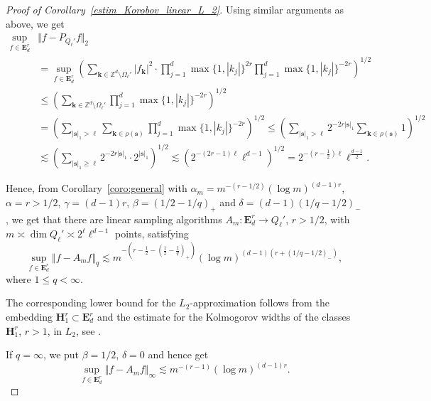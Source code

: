 \documentclass[a4paper,12pt]{amsart}
\theoremstyle{definition}
\theoremstyle{remark}
\newcommand{\abs}[1]{\left|#1\right|}
\newcommand{\bk}{\mathbf{k}}
\begin{document}
{\begin{proof}[Proof of Corollary~\ref{estim_Korobov_linear_L_2}]
Using similar arguments as above, we get
\begin{align*}
	\sup_{f \in \mathbf{E}^r_d} & \Vert f - P_{Q_\ell'} f  \Vert_2
	\\ 
&	=
		\sup_{f \in \mathbf{E}^r_d} \left(
		\sum_{\bk\in \mathbb{Z}^d \setminus \Omega_\ell'}
		\abs{f_{\bk}}^2 \cdot \prod_{j=1}^{d}\max \{1,  \abs{k_j}\}^{2r} 
		\prod_{j=1}^{d}\max \{1,  \abs{k_j}\}^{-2r} 
		\right)^{1/2}
		\\
& 
\leq 
	\left( \sum_{\bk\in \mathbb{Z}^d \setminus \Omega_\ell'}
	\prod_{j=1}^{d}\max \{1,  \abs{k_j}\}^{-2r}
	\right)^{1/2}
\\
& =\left( \sum_{\abs{\boldsymbol{s}}_1 > \ell}  \sum_{\bk\in \rho(\boldsymbol{s})} 
	\prod_{j=1}^{d}\max \{1,  \abs{k_j}\}^{-2r}
	\right)^{1/2}
	\leq \left( \sum_{\abs{\boldsymbol{s}}_1 > \ell}  2^{-2r \abs{\boldsymbol{s}}_1} \sum_{\bk\in \rho(\boldsymbol{s})} 1
	\right)^{1/2} 
			\\
& \lesssim \left( \sum_{\abs{\boldsymbol{s}}_1 \geq \ell}  2^{-2r \abs{\boldsymbol{s}}_1}  \cdot 2^{\abs{\boldsymbol{s}}_1}
	\right)^{1/2} 
	\lesssim  \left( 2^{- (2r-1)\ell}  \ell^{d-1}\right)^{1/2} 
= 2^{-(r-\frac{1}{2})\ell} \ell^{\frac{d-1}{2}}.
\end{align*}



Hence, from 
{Corollary~\ref{coro:general}}
with $\alpha_m = m^{-(r-1/2)} (\log m)^{(d-1)r}$, $\alpha = r >1/2$, $\gamma =(d-1)r$,
$\beta = (1/2-1/q)_+$ and $\delta =(d-1)(1/q-1/2)_-$, we get that
there are linear sampling algorithms $A_m \colon \mathbf{E}^r_d  \to Q_\ell'$,
 $r>1/2$, with $m \asymp \dim Q_\ell' \asymp 2^\ell \ell^{d-1}$
  {points,}
satisfying
$$
\sup_{f \in \mathbf{E}^r_d} \Vert f - A_m f  \Vert_q \lesssim 
m^{-(r -  \frac{1}{2} - (\frac12-\frac{1}{q})_+)} (\log m)^{(d-1)(r +(1/q-1/2)_- )},
$$
where $1\leq q 
<\infty$.


The corresponding lower bound for the $L_2$-approximation follows from the embedding $\mathbf{H}^r_1 \subset \mathbf{E}^r_d $ and the estimate for the Kolmogorov widths of the classes $\mathbf{H}^r_1$, $r>1$, in $L_2$, see \cite[Thm. 4.3.12]{DTU18}.

If $q=\infty$, we put $\beta = 1/2$, $\delta =0$ and hence get
$$
\sup_{f \in \mathbf{E}^r_d} \Vert f - A_m f  \Vert_\infty \lesssim 
m^{-(r-1)} (\log m)^{(d-1)r }.
$$
\end{proof}








}
\end{document}

